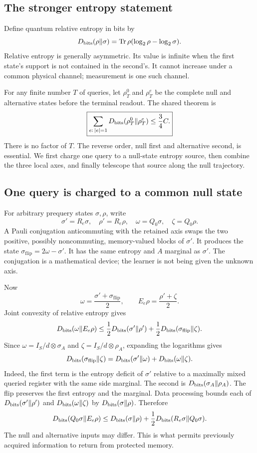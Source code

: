 \documentclass[11pt,a4paper]{article}
\numberwithin{equation}{section}
\theoremstyle{definition}
\theoremstyle{remark}
\begin{document}
\subsection{The stronger entropy statement}
Define quantum relative entropy in bits by
\[
 D_{\rm bits}(\rho\Vert\sigma)
 =\operatorname{Tr}\rho(\log_2\rho-\log_2\sigma).
\]
Relative entropy is generally asymmetric. Its value is infinite when the first state's support is not contained in the second's. It cannot increase under a common physical channel; measurement is one such channel.

For any finite number \(T\) of queries, let \(\rho_T^0\) and \(\rho_T^e\) be the complete null and alternative states before the terminal readout. The shared theorem is
\begin{equation}
 \boxed{\sum_{e:\,|e|=1}D_{\rm bits}(\rho_T^0\Vert\rho_T^e)
 \leq\frac34 C.}
 \label{eq:plmt-entropy-theorem}
\end{equation}
There is no factor of \(T\). The reverse order, null first and alternative second, is essential. We first charge one query to a null-state entropy source, then combine the three local axes, and finally telescope that source along the null trajectory.

\subsection{One query is charged to a common null state}
For arbitrary prequery states \(\sigma,\rho\), write
\[
 \sigma'=R_e\sigma,\quad \rho'=R_e\rho,\quad
 \omega=Q_0\sigma,\quad \zeta=Q_0\rho.
\]
A Pauli conjugation anticommuting with the retained axis swaps the two positive, possibly noncommuting, memory-valued blocks of \(\sigma'\). It produces the state
\(\sigma_{\mathrm{flip}}=2\omega-\sigma'\). It has the same entropy and \(A\) marginal as \(\sigma'\). The conjugation is a mathematical device; the learner is not being given the unknown axis.

Now
\[
 \omega=\frac{\sigma'+\sigma_{\mathrm{flip}}}{2},
 \qquad E_e\rho=\frac{\rho'+\zeta}{2}.
\]
Joint convexity of relative entropy gives
\[
 D_{\rm bits}(\omega\Vert E_e\rho)
 \leq\frac12D_{\rm bits}(\sigma'\Vert\rho')
 +\frac12D_{\rm bits}(\sigma_{\mathrm{flip}}\Vert\zeta).
\]
Since \(\omega=I_S/d\otimes\sigma_A\) and
\(\zeta=I_S/d\otimes\rho_A\), expanding the logarithms gives
\[
 D_{\rm bits}(\sigma_{\mathrm{flip}}\Vert\zeta)
 =D_{\rm bits}(\sigma'\Vert\omega)+D_{\rm bits}(\omega\Vert\zeta).
\]
Indeed, the first term is the entropy deficit of \(\sigma'\) relative to a maximally mixed queried register with the same side marginal. The second is
\(D_{\rm bits}(\sigma_A\Vert\rho_A)\). The flip preserves the first entropy and the marginal. Data processing bounds each of
\(D_{\rm bits}(\sigma'\Vert\rho')\) and \(D_{\rm bits}(\omega\Vert\zeta)\) by \(D_{\rm bits}(\sigma\Vert\rho)\). Therefore
\begin{equation}
 D_{\rm bits}(Q_0\sigma\Vert E_e\rho)
 \leq D_{\rm bits}(\sigma\Vert\rho)
 +\frac12D_{\rm bits}(R_e\sigma\Vert Q_0\sigma).
 \label{eq:plmt-entropy-coupling}
\end{equation}
The null and alternative inputs may differ. This is what permits previously acquired information to return from protected memory.
\end{document}
